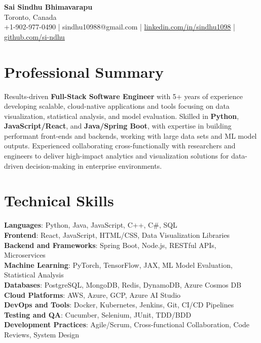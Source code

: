 \documentclass[letterpaper,11pt]{article}
\begin{document}
\begin{center}
  {\Large \textbf{Sai Sindhu Bhimavarapu}} \\
  Toronto, Canada \\
  +1-902-977-0490 \enspace | \enspace sindhu10988@gmail.com \enspace | \enspace \href{https://www.linkedin.com/in/sindhu1098/}{linkedin.com/in/sindhu1098} \enspace | \enspace \href{https://github.com/si-ndhu}{github.com/si-ndhu}
\end{center}

\section{Professional Summary}
  \begin{itemize}[leftmargin=0.15in, label={}]
    \small{\item{
     Results-driven \textbf{Full-Stack Software Engineer} with 5+ years of experience developing scalable, cloud-native applications and tools focusing on data visualization, statistical analysis, and model evaluation. Skilled in \textbf{Python}, \textbf{JavaScript/React}, and \textbf{Java/Spring Boot}, with expertise in building performant front-ends and backends, working with large data sets and ML model outputs. Experienced collaborating cross-functionally with researchers and engineers to deliver high-impact analytics and visualization solutions for data-driven decision-making in enterprise environments.
    }}
  \end{itemize}
\vspace{-16pt}

\section{Technical Skills}
 \begin{itemize}[leftmargin=0.15in, label={}]
    \small{\item{
     \textbf{Languages}: Python, Java, JavaScript, C++, C\#, SQL \\
     \textbf{Frontend}: React, JavaScript, HTML/CSS, Data Visualization Libraries \\
     \textbf{Backend and Frameworks}: Spring Boot, Node.js, RESTful APIs, Microservices \\
     \textbf{Machine Learning}: PyTorch, TensorFlow, JAX, ML Model Evaluation, Statistical Analysis \\
     \textbf{Databases}: PostgreSQL, MongoDB, Redis, DynamoDB, Azure Cosmos DB \\
     \textbf{Cloud Platforms}: AWS, Azure, GCP, Azure AI Studio \\
     \textbf{DevOps and Tools}: Docker, Kubernetes, Jenkins, Git, CI/CD Pipelines \\
     \textbf{Testing and QA}: Cucumber, Selenium, JUnit, TDD/BDD \\
     \textbf{Development Practices}: Agile/Scrum, Cross-functional Collaboration, Code Reviews, System Design
    }}
 \end{itemize}
\vspace{-16pt}
\end{document}
